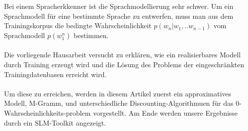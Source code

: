 Bei einem Spracherkkenner ist die Sprachmodellierung sehr schwer. Um ein Sprachmodell f\"ur eine bestimmte Sprache zu entwerfen, muss man aus dem Trainingskorpus die bedingte Wahrscheinlichkeit $p(w_{n}|w_{1},..w_{n-1})$   vom Sprachmodell $p(w_{1}^n)$   bestimmen.
\\
\\
Die vorliegende Hausarbeit versucht zu erkl\"aren, wie ein realisierbares Modell durch Training erzeugt wird und die L\"osung des Problems der eingeschr\"ankten Trainingdatenbasen erreicht wird. 
\\
\\
Um diese zu erreichen, werden in diesem Artikel zuerst ein approximatives Modell, M-Gramm, und unterschiedliche Discounting-Algorithmuen f\"ur das 0-Wahrscheinlichkeits-problem vorgestellt. Am Ende werden unsere Ergebnisse durch ein SLM-Toolkit angezeigt.
